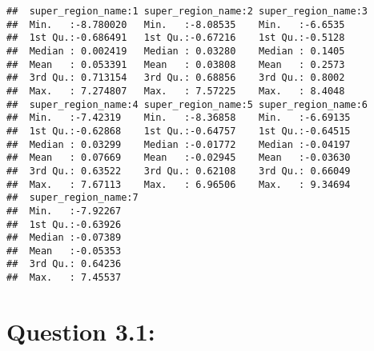 \documentclass[
]{article}
\begin{document}
\begin{verbatim}
##  super_region_name:1 super_region_name:2 super_region_name:3
##  Min.   :-8.780020   Min.   :-8.08535    Min.   :-6.6535    
##  1st Qu.:-0.686491   1st Qu.:-0.67216    1st Qu.:-0.5128    
##  Median : 0.002419   Median : 0.03280    Median : 0.1405    
##  Mean   : 0.053391   Mean   : 0.03808    Mean   : 0.2573    
##  3rd Qu.: 0.713154   3rd Qu.: 0.68856    3rd Qu.: 0.8002    
##  Max.   : 7.274807   Max.   : 7.57225    Max.   : 8.4048    
##  super_region_name:4 super_region_name:5 super_region_name:6
##  Min.   :-7.42319    Min.   :-8.36858    Min.   :-6.69135   
##  1st Qu.:-0.62868    1st Qu.:-0.64757    1st Qu.:-0.64515   
##  Median : 0.03299    Median :-0.01772    Median :-0.04197   
##  Mean   : 0.07669    Mean   :-0.02945    Mean   :-0.03630   
##  3rd Qu.: 0.63522    3rd Qu.: 0.62108    3rd Qu.: 0.66049   
##  Max.   : 7.67113    Max.   : 6.96506    Max.   : 9.34694   
##  super_region_name:7
##  Min.   :-7.92267   
##  1st Qu.:-0.63926   
##  Median :-0.07389   
##  Mean   :-0.05353   
##  3rd Qu.: 0.64236   
##  Max.   : 7.45537
\end{verbatim}

\hypertarget{question-3.1}{%
\section{Question 3.1:}\label{question-3.1}}
\end{document}
